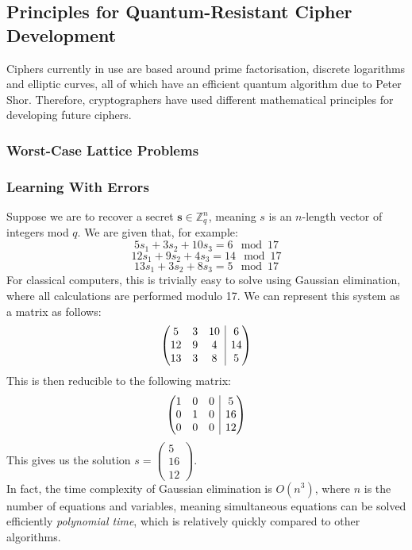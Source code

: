 \documentclass{article}
\begin{document}
\subsection{Principles for Quantum-Resistant Cipher Development}
Ciphers currently in use are based around prime factorisation, discrete
logarithms and elliptic curves, all of which have an efficient quantum
algorithm due to Peter Shor. Therefore, cryptographers have used different
mathematical principles for developing future ciphers.

\subsubsection{Worst-Case Lattice Problems}
\subsubsection{Learning With Errors}
Suppose we are to recover a secret $\bm{s} \in \mathbb{Z}^{n}_{q}$, meaning $s$ is an $n$-length vector of integers mod $q$.
We are given that, for example:
\[ 5s_{1} + 3s_{2} + 10s_{3} = 6 \mod{17} \] 
\[ 12s_{1} + 9s_{2} + 4s_{3} = 14 \mod{17} \] 
\[ 13s_{1} + 3s_{2} + 8s_{3} = 5 \mod{17} \] 
For classical computers, this is trivially easy to solve using Gaussian
elimination, where all calculations are performed modulo 17. We can represent
this system as a matrix as follows:
\[
\left(\begin{array}{@{}ccc|c@{}}
   5 & 3 & 10 & 6 \\
   12 & 9 & 4 & 14 \\
   13 & 3 & 8 & 5
\end{array}\right)
\]
This is then reducible to the following matrix:
\[
\left(\begin{array}{@{}ccc|c@{}}
   1 & 0 & 0 & 5 \\
   0 & 1 & 0 & 16 \\
   0 & 0 & 0 & 12
\end{array}\right)
\]
This gives us the solution $s = \begin{pmatrix} 5 \\ 16 \\ 12 \end{pmatrix}$. \\
In fact, the time complexity of Gaussian elimination is $O(n^{3})$, where $n$
is the number of equations and variables, meaning simultaneous equations can be
solved efficiently \textit{polynomial time}, which is relatively quickly
compared to other algorithms.
\\
\end{document}
